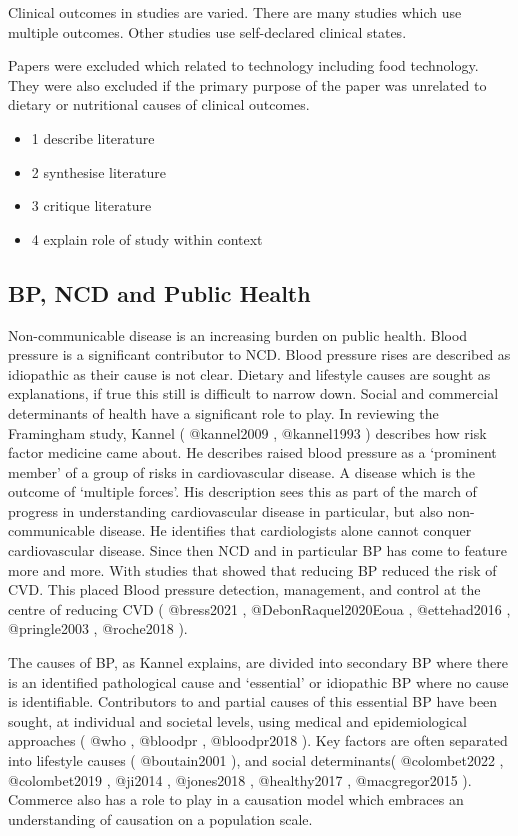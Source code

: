 \documentclass[
]{article}
\providecommand{\tightlist}{%
  \setlength{\itemsep}{0pt}\setlength{\parskip}{0pt}}
\begin{document}
Clinical outcomes in studies are varied. There are many studies which
use multiple outcomes. Other studies use self-declared clinical states.

Papers were excluded which related to technology including food
technology. They were also excluded if the primary purpose of the paper
was unrelated to dietary or nutritional causes of clinical outcomes.

\begin{itemize}
\tightlist
\item
  1 describe literature
\item
  2 synthesise literature
\item
  3 critique literature
\item
  4 explain role of study within context
\end{itemize}

\hypertarget{bp-ncd-and-public-health}{%
\subsection{BP, NCD and Public Health}\label{bp-ncd-and-public-health}}

Non-communicable disease is an increasing burden on public health. Blood
pressure is a significant contributor to NCD. Blood pressure rises are
described as idiopathic as their cause is not clear. Dietary and
lifestyle causes are sought as explanations, if true this still is
difficult to narrow down. Social and commercial determinants of health
have a significant role to play. In reviewing the Framingham study,
Kannel ( @kannel2009 , @kannel1993 ) describes how risk factor medicine
came about. He describes raised blood pressure as a `prominent member'
of a group of risks in cardiovascular disease. A disease which is the
outcome of `multiple forces'. His description sees this as part of the
march of progress in understanding cardiovascular disease in particular,
but also non-communicable disease. He identifies that cardiologists
alone cannot conquer cardiovascular disease. Since then NCD and in
particular BP has come to feature more and more. With studies that
showed that reducing BP reduced the risk of CVD. This placed Blood
pressure detection, management, and control at the centre of reducing
CVD ( @bress2021 , @DebonRaquel2020Eoua , @ettehad2016 , @pringle2003 ,
@roche2018 ).

The causes of BP, as Kannel explains, are divided into secondary BP
where there is an identified pathological cause and `essential' or
idiopathic BP where no cause is identifiable. Contributors to and
partial causes of this essential BP have been sought, at individual and
societal levels, using medical and epidemiological approaches ( @who ,
@bloodpr , @bloodpr2018 ). Key factors are often separated into
lifestyle causes ( @boutain2001 ), and social determinants(
@colombet2022 , @colombet2019 , @ji2014 , @jones2018 , @healthy2017 ,
@macgregor2015 ). Commerce also has a role to play in a causation model
which embraces an understanding of causation on a population scale.
\end{document}
